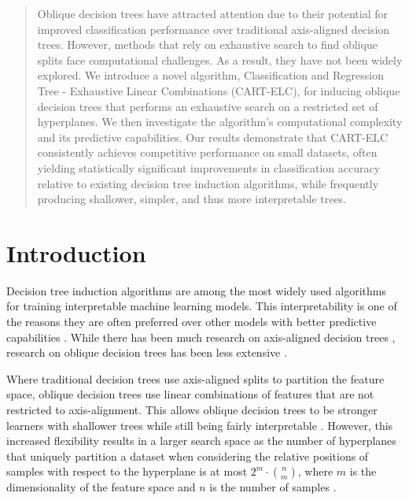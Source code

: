 \documentclass[10pt]{article} %
\begin{document}
\begin{abstract}

Oblique decision trees have attracted attention due to their potential for improved classification performance over traditional axis-aligned decision trees. However, methods that rely on exhaustive search to find oblique splits face computational challenges. As a result, they have not been widely explored. We introduce a novel algorithm, Classification and Regression Tree - Exhaustive Linear Combinations (CART-ELC), for inducing oblique decision trees that performs an exhaustive search on a restricted set of hyperplanes. We then investigate the algorithm's  computational complexity and its predictive capabilities. Our results demonstrate that CART-ELC consistently achieves competitive performance on small datasets, often yielding statistically significant improvements in classification accuracy relative to existing decision tree induction algorithms, while frequently producing shallower, simpler, and thus more interpretable trees.



\end{abstract}

%
%




\section{Introduction}\label{introduction}

Decision tree induction algorithms are among the most widely used algorithms for training interpretable machine learning models. This interpretability is one of the reasons they are often preferred over other models with better predictive capabilities \citep{survey, boosting}. While there has been much research on axis-aligned decision trees \citep{recent_overview, breiman1984cart, survey}, research on oblique decision trees has been less extensive \citep{HHCart, MurthyKS94, breiman1984cart}.

Where traditional decision trees use axis-aligned splits to partition the feature space, oblique decision trees use linear combinations of features that are not restricted to axis-alignment. This allows oblique decision trees to be stronger learners with shallower trees while still being fairly interpretable \citep{MurthyKS94}. However, this increased flexibility results in a larger search space as the number of hyperplanes that uniquely partition a dataset when considering the relative positions of samples with respect to the hyperplane is at most $2^m \cdot \binom{n}{m}$,  where $m$ is the dimensionality of the feature space and $n$ is the number of samples \citep{MurthyKS94}.
\end{document}
